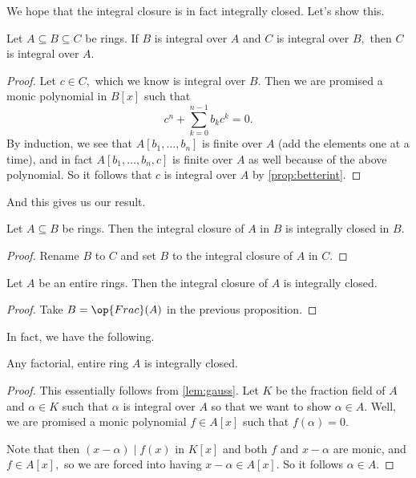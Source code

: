 We hope that the integral closure is in fact integrally closed. Let's show this.
\begin{lem}
    Let $A\subseteq B\subseteq C$ be rings. If $B$ is integral over $A$ and $C$ is integral over $B,$ then $C$ is integral over $A.$
\end{lem}
\begin{proof}
    Let $c\in C,$ which we know is integral over $B.$ Then we are promised a monic polynomial in $B[x]$ such that
    \[c^n+\sum_{k=0}^{n-1}b_kc^k=0.\]
    By induction, we see that $A[b_1,\ldots,b_n]$ is finite over $A$ (add the elements one at a time), and in fact $A[b_1,\ldots,b_n,c]$ is finite over $A$ as well because of the above polynomial. So it follows that $c$ is integral over $A$ by \autoref{prop:betterint}.
\end{proof}
And this gives us our result.
\begin{prop}
    Let $A\subseteq B$ be rings. Then the integral closure of $A$ in $B$ is integrally closed in $B.$
\end{prop}
\begin{proof}
    Rename $B$ to $C$ and set $B$ to the integral closure of $A$ in $C.$
\end{proof}
\begin{prop}
    Let $A$ be an entire rings. Then the integral closure of $A$ is integrally closed.
\end{prop}
\begin{proof}
    Take $B=\op{Frac}(A)$ in the previous proposition.
\end{proof}
In fact, we have the following.
\begin{prop}
    Any factorial, entire ring $A$ is integrally closed.
\end{prop}
\begin{proof}
    This essentially follows from \autoref{lem:gauss}. Let $K$ be the fraction field of $A$ and $\alpha\in K$ such that $\alpha$ is integral over $A$ so that we want to show $\alpha\in A.$ Well, we are promised a monic polynomial $f\in A[x]$ such that $f(\alpha)=0.$
    
    Note that then $(x-\alpha)\mid f(x)$ in $K[x]$ and both $f$ and $x-\alpha$ are monic, and $f\in A[x],$ so we are forced into having $x-\alpha\in A[x].$ So it follows $\alpha\in A.$
\end{proof}

